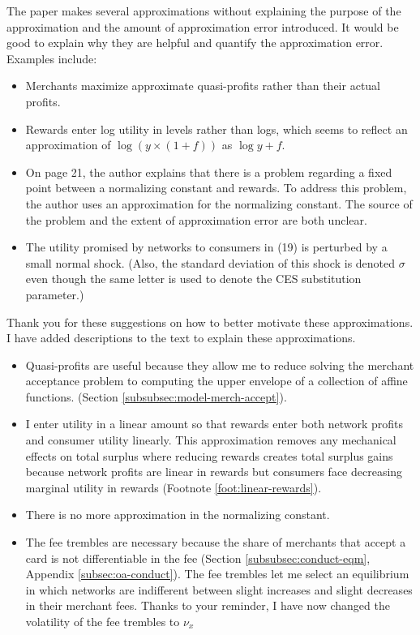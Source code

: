 \documentclass[main.tex]{subfiles}
\begin{document}
\begin{refsection}
\begin{refcomment}
The paper makes several approximations without explaining the purpose of the approximation and the amount of approximation error introduced.
It would be good to explain why they are helpful and quantify the approximation error.
Examples include:
\begin{itemize}
\item Merchants maximize approximate quasi-profits rather than their actual profits.
\item Rewards enter log utility in levels rather than logs, which seems to reflect an approximation of \(\log(y \times (1+ f))\) as \(\log y + f\).
\item On page 21, the author explains that there is a problem regarding a fixed point between a normalizing constant and rewards.
To address this problem, the author uses an approximation for the normalizing constant.
The source of the problem and the extent of approximation error are both unclear.
\item The utility promised by networks to consumers in (19) is perturbed by a small normal shock. (Also, the standard deviation of this shock is denoted \(\sigma\) even though the same letter is used to denote the CES substitution parameter.)
\end{itemize}
\end{refcomment}

Thank you for these suggestions on how to better motivate these approximations.
I have added descriptions to the text to explain these approximations.

\begin{itemize}
    \item Quasi-profits are useful because they allow me to reduce solving the merchant acceptance problem to computing the upper envelope of a collection of affine functions. (Section \ref{subsubsec:model-merch-accept}).
    \item I enter utility in a linear amount so that rewards enter both network profits and consumer utility linearly.
This approximation removes any mechanical effects on total surplus where reducing rewards creates total surplus gains because network profits are linear in rewards but consumers face decreasing marginal utility in rewards (Footnote \ref{foot:linear-rewards}).
    \item There is no more approximation in the normalizing constant.
    \item The fee trembles are necessary because the share of merchants that accept a card is not differentiable in the fee (Section \ref{subsubsec:conduct-eqm}, Appendix \ref{subsec:oa-conduct}).
The fee trembles let me select an equilibrium in which networks are indifferent between slight increases and slight decreases in their merchant fees.
Thanks to your reminder, I have now changed the volatility of the fee trembles to $\nu_x$
\end{itemize}


\end{refsection}
\end{document}
